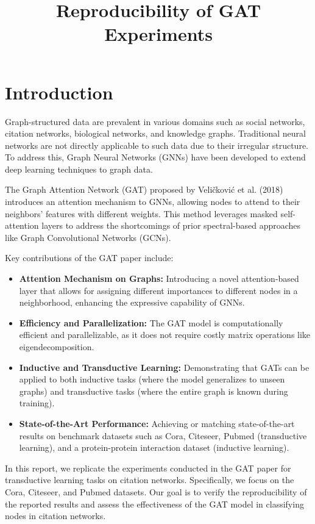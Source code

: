 \documentclass[12pt]{article}
\title{Reproducibility of GAT Experiments}
\author{}
\date{}
\begin{document}
\maketitle
\justifying

\section{Introduction}
Graph-structured data are prevalent in various domains such as social networks, citation networks, biological networks, and knowledge graphs. Traditional neural networks are not directly applicable to such data due to their irregular structure. To address this, Graph Neural Networks (GNNs) have been developed to extend deep learning techniques to graph data.

The Graph Attention Network (GAT) proposed by Veličković et al. (2018) introduces an attention mechanism to GNNs, allowing nodes to attend to their neighbors' features with different weights. This method leverages masked self-attention layers to address the shortcomings of prior spectral-based approaches like Graph Convolutional Networks (GCNs).

Key contributions of the GAT paper include:
\begin{itemize}[leftmargin=1.5em]
    \item \textbf{Attention Mechanism on Graphs:} Introducing a novel attention-based layer that allows for assigning different importances to different nodes in a neighborhood, enhancing the expressive capability of GNNs.
    \item \textbf{Efficiency and Parallelization:} The GAT model is computationally efficient and parallelizable, as it does not require costly matrix operations like eigendecomposition.
    \item \textbf{Inductive and Transductive Learning:} Demonstrating that GATs can be applied to both inductive tasks (where the model generalizes to unseen graphs) and transductive tasks (where the entire graph is known during training).
    \item \textbf{State-of-the-Art Performance:} Achieving or matching state-of-the-art results on benchmark datasets such as Cora, Citeseer, Pubmed (transductive learning), and a protein-protein interaction dataset (inductive learning).
\end{itemize}

In this report, we replicate the experiments conducted in the GAT paper for transductive learning tasks on citation networks. Specifically, we focus on the Cora, Citeseer, and Pubmed datasets. Our goal is to verify the reproducibility of the reported results and assess the effectiveness of the GAT model in classifying nodes in citation networks.
\end{document}
